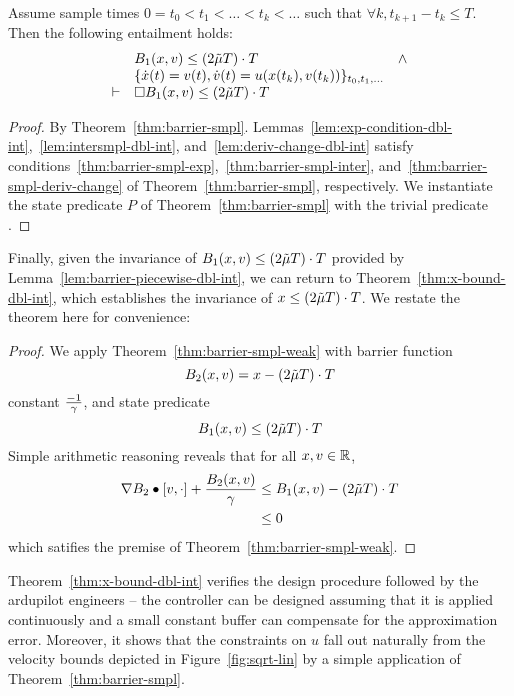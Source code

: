 \begin{lemma}
Assume sample times $0 = t_0 < t_1 < \ldots < t_k < \ldots$ such that
$\forall k, t_{k+1} - t_k \leq T$. Then the following entailment holds:
\[
\begin{array}{clc}
&
B_1 (x,v) \leq (2\tilde{\mu} T) \cdot T & \wedge \\
& \{\dot{x}(t) = v(t), \dot{v}(t) = u(x(t_k),v(t_k))\}_{t_0,t_1,\ldots} & \\
\vdash
&
\Box{} B_1 (x,v) \leq (2\tilde{\mu} T) \cdot T &
\end{array}
\]
\label{lem:barrier-piecewise-dbl-int}
\end{lemma}
\begin{proof}
By
Theorem~\ref{thm:barrier-smpl}. Lemmas~\ref{lem:exp-condition-dbl-int},~\ref{lem:intersmpl-dbl-int},
and~\ref{lem:deriv-change-dbl-int} satisfy
conditions~\eqref{thm:barrier-smpl-exp},~\eqref{thm:barrier-smpl-inter},
and~\eqref{thm:barrier-smpl-deriv-change} of
Theorem~\ref{thm:barrier-smpl}, respectively. We instantiate the state
predicate $P$ of Theorem~\ref{thm:barrier-smpl} with the trivial predicate
\True.
\end{proof}

Finally, given the invariance of $B_1 (x,v) \leq (2\tilde{\mu} T) \cdot T$
provided by Lemma~\ref{lem:barrier-piecewise-dbl-int}, we can return to
Theorem~\ref{thm:x-bound-dbl-int}, which establishes the invariance of $x
\leq (2\tilde{\mu} T) \cdot T$. We restate the theorem here for convenience:

\xbounddblint*
\begin{proof}
We apply Theorem~\ref{thm:barrier-smpl-weak} with barrier function
\[
B_2 (x,v) = x - (2\tilde{\mu} T)\cdot T\]
constant $\frac{-1}{\gamma}$, and state predicate
\[
B_1 (x,v) \leq (2\tilde{\mu} T) \cdot T
\]
Simple arithmetic reasoning reveals
that for all $x,v \in \mathbb{R}$,
\begin{align}
\nabla B_2 \bullet [v,\cdot] + \frac{B_2 (x,v)}{\gamma} &\leq B_1 (x,v) - (2\tilde{\mu} T)\cdot T \\
&\leq 0
\end{align}
which satifies the premise of Theorem~\ref{thm:barrier-smpl-weak}.
\end{proof}

Theorem~\ref{thm:x-bound-dbl-int} verifies the design procedure followed by
the ardupilot engineers -- the controller can be designed assuming that it
is applied continuously and a small constant buffer can compensate for the
approximation error. Moreover, it shows that the constraints on $u$ fall
out naturally from the velocity bounds depicted in
Figure~\ref{fig:sqrt-lin} by a simple application of
Theorem~\ref{thm:barrier-smpl}.


